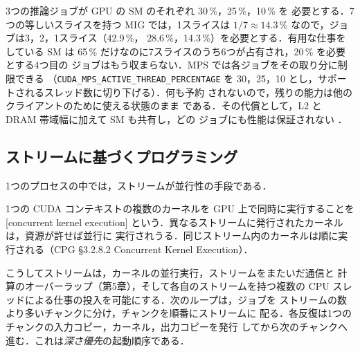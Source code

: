 \documentclass[../main.tex]{subfiles}
\begin{document}
\begin{example}[3つのジョブを収める]
  \label{ex:l09-fit}
  3つの推論ジョブが GPU の SM のそれぞれ 30\,\%，25\,\%，10\,\% を
  必要とする．7つの等しいスライスを持つ MIG では，1スライスは
  $1/7 \approx 14.3\,\%$ なので，ジョブは3，2，1スライス（42.9\,\%，
  28.6\,\%，14.3\,\%）を必要とする．有用な仕事をしている SM は 65\,\%
  だけなのに7スライスのうち6つが占有され，20\,\% を必要とする4つ目の
  ジョブはもう収まらない．MPS では各ジョブをその取り分に制限できる
  （\texttt{CUDA\_MPS\_\allowbreak ACTIVE\_\allowbreak THREAD\_\allowbreak PERCENTAGE}
  を 30，25，10 とし，サポートされるスレッド数に切り下げる）．何も予約
  されないので，残りの能力は他のクライアントのために使える状態のまま
  である．その代償として，L2 と DRAM 帯域幅に加えて SM も共有し，どの
  ジョブにも性能は保証されない
  \cite[§1.1.2.2.5]{nvidia2026mps}．
\end{example}


\subsection{ストリームに基づくプログラミング}

1つのプロセスの中では，ストリームが並行性の手段である．

\begin{definition}[カーネルの並行実行]
  1つの CUDA コンテキストの複数のカーネルを GPU 上で同時に実行することを
  [concurrent kernel execution]
  という．異なるストリームに発行されたカーネルは，資源が許せば並行に
  実行されうる．同じストリーム内のカーネルは順に実行される（CPG
  §3.2.8.2 Concurrent Kernel Execution）．
\end{definition}

%
こうしてストリームは，カーネルの並行実行，ストリームをまたいだ通信と
計算のオーバーラップ（第5章），そして各自のストリームを持つ複数の CPU
スレッドによる仕事の投入を可能にする．次のループは，ジョブを
ストリームの数より多いチャンクに分け，チャンクを順番にストリームに
配る．各反復は1つのチャンクの入力コピー，カーネル，出力コピーを発行
してから次のチャンクへ進む．これは\emph{深さ優先}の起動順序である．
\end{document}
